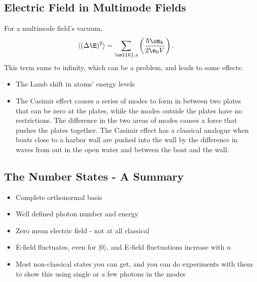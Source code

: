 \documentclass[a4paper, 11pt, normalem]{report}
\begin{document}
\section{Electric Field in Multimode Fields}
For a multimode field's vacuum, 
\begin{align}
    \langle(\Delta\E)^2\rangle &= \sum_{\unl{k},s}\left(\frac{\hbar\om_k}{2\e_0V}\right).
\end{align}
This term sums to infinity, which can be a problem, and leads to some effects:
\begin{itemize}
    \item The Lamb shift in atoms' energy levels
    \item The Casimir effect causes a series of modes to form in between two plates that can be zero at the plates, while the modes outside the plates have no restrictions. The difference in the two areas of modes causes a force that pushes the plates together.
        The Casimir effect has a classical analogue when boats close to a harbor wall are pushed into the wall by the difference in waves from out in the open water and between the boat and the wall. 
\end{itemize}

\section{The Number States - A Summary}
\begin{itemize}
    \item Complete orthonormal basis
    \item Well defined photon number and energy
    \item Zero mean electric field - not at all classical
    \item E-field fluctuates, even for $|0\rangle$, and E-field fluctuations increase with $n$
    \item Most non-classical states you can get, and you can do experiments with them to show this using single or a few photons in the modes
\end{itemize}

\chapter{}
\end{document}
